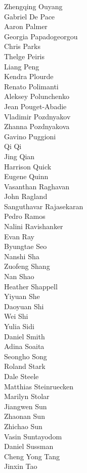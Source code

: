 Zhengqing Ouyang\\
Gabriel De Pace\\
Aaron Palmer\\
Georgia Papadogeorgou\\
Chris Parks\\
Thelge Peiris\\
Liang Peng\\
Kendra Plourde\\
Renato Polimanti\\
Aleksey Polunchenko\\
Jean Pouget-Abadie\\
Vladimir Pozdnyakov\\
Zhanna Pozdnyakova\\
Gavino Puggioni\\
Qi Qi\\
Jing Qian\\
Harrison  Quick\\
Eugene Quinn\\
Vasanthan Raghavan\\
John Ragland\\
Sanguthavar Rajasekaran\\
Pedro Ramos\\
Nalini Ravishanker\\
Evan Ray\\
Byungtae Seo\\
Nanshi Sha\\
Zuofeng Shang\\
Nan Shao\\
Heather Shappell\\
Yiyuan She\\
Daoyuan Shi\\
Wei Shi\\
Yulia Sidi\\
Daniel Smith\\
Adina Soaita\\
Seongho Song\\
Roland Stark\\
Dale Steele\\
Matthias Steinruecken\\
Marilyn Stolar\\
Jiangwen Sun\\
Zhaonan Sun\\
Zhichao Sun\\
Vasin  Suntayodom\\
Daniel Sussman\\
Cheng Yong Tang\\
Jinxin Tao\\
